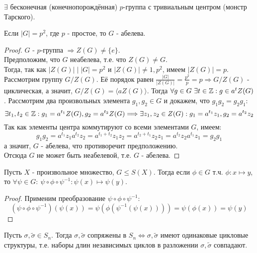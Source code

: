 \begin{remark}
    $\exists$ бесконечная (конечнопорождённая) $p$-группа с тривиальным центром (монстр Тарского).
\end{remark}
\begin{consequense}
    Если $|G| = p^2$, где $p$ - простое, то $G$ - абелева.
\end{consequense}
\begin{proof}
    $G$ - $p$-группа $\Longrightarrow Z(G) \neq \{e\}$.\\
    Предположим, что $G$ неабелева, т.е. что $Z(G) \neq G$. \\
    Тогда, так как $|Z(G)| \mid |G| = p^2$ и $|Z(G)| \neq 1, p^2$, имеем $|Z(G)| = p$.\\
    Рассмотрим группу $G / Z(G)$. Её порядок равен $\frac{|G|}{|Z(G)|} = \frac{p^2}{p} = p \Longrightarrow G / Z(G)$ - циклическая, а значит, $G / Z(G) = \langle aZ(G) \rangle$. Тогда $\forall g \in G \ \exists t \in \mathbb{Z}: g \in a^tZ(G)$. Рассмотрим два произвольных элемента $g_1, g_2 \in G$ и докажем, что $g_1g_2 = g_2g_1$:
    \[\exists t_1, t_2 \in \mathbb{Z}: g_1 = a^{t_1}Z(G), g_2 = a^{t_2}Z(G) \Longrightarrow \exists z_1, z_2 \in Z(G):  g_1 = a^{t_1}z_1, g_2 = a^{t_2}z_2\]
    Так как элементы центра коммутируют со всеми элементами $G$, имеем:
    \[g_1g_2 = a^{t_1}z_1a^{t_2}z_2 = a^{t_1 + t_2}z_1z_2 = a^{t_2 + t_1}z_2z_1 = a^{t_2}z_2a^{t_1}z_1 = g_2g_1\]
    а значит, $G$ - абелева, что противоречит предположению.\\
    Отсюда $G$ не может быть неабелевой, т.е. $G$ - абелева. 
\end{proof}
\begin{lemmanum}
    Пусть $X$ - произвольное множество, $G \leq S(X)$. Тогда если $\phi \in G$ т.ч. $\phi: x \mapsto y$, то $\forall \psi \in G: \ \psi \circ \phi \circ \psi^{-1}: \psi(x) \mapsto \psi(y)$.
\end{lemmanum}
\begin{proof}
    Применим преобразование $\psi \circ \phi \circ \psi^{-1}$:
    \[(\psi \circ \phi \circ \psi^{-1})(\psi(x)) = \psi (\phi (\psi^{-1}(\psi(x)))) = \psi(\phi(x)) = \psi(y)\]
\end{proof}
\begin{subtheoremnum}
    Пусть $\sigma, \tilde{\sigma} \in S_n$. Тогда $\sigma, \tilde{\sigma}$ сопряжены в $S_n \Longleftrightarrow \sigma, \tilde{\sigma}$ имеют одинаковые цикловые структуры, т.е. наборы длин независимых циклов в разложении $\sigma, \tilde{\sigma}$ совпадают.
\end{subtheoremnum}
